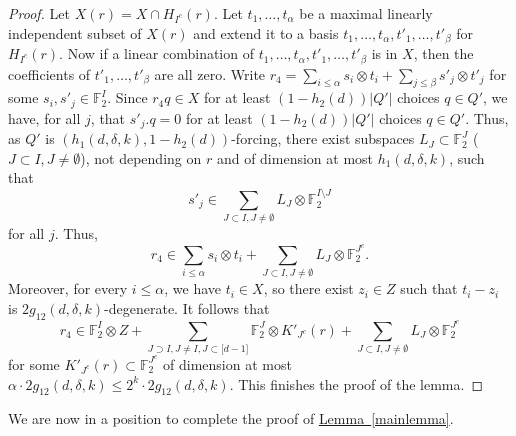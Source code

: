 \documentclass[11pt]{article}
\numberwithin{equation}{section}
\theoremstyle{definition}
\theoremstyle{plain}
\newcommand{\expref}[2]{\hyperref[#2]{#1~\ref{#2}}}
\newcommand\F{\mathbb{F}}
\renewcommand\a{\alpha}
\renewcommand\d{\delta}
\newcommand \s{\subset}
\begin{document}
\begin{proof}
  Let $X(r)=X\cap H_{I^c}(r)$. Let $t_1,\dots,t_{\a}$ be a maximal linearly independent subset of $X(r)$ and extend it to a basis $t_1,\dots,t_{\a},t'_1,\dots,t'_{\beta}$ for $H_{I^c}(r)$. Now if a linear combination of $t_1,\dots,t_{\a},t'_1,\dots,t'_{\beta}$ is in $X$, then the coefficients of $t'_1,\dots,t'_{\beta}$ are all zero. Write $r_4=\sum_{i\leq \a}s_i\otimes t_i+\sum_{j\leq \beta}s'_j\otimes t'_j$ for some $s_i,s'_j\in \F_2^{I}$. Since $r_4q\in X$ for at least $(1-h_2(d))|Q'|$ choices $q\in Q'$, we have, for all $j$, that $s'_j.q=0$ for at least $(1-h_2(d))|Q'|$ choices $q\in Q'$. Thus, as $Q'$ is $(h_1(d,\d,k),1-h_2(d))$-forcing, there exist subspaces $L_J\s \F_2^{J}$ ($J\s I,J\neq \emptyset$), not depending on $r$ and of dimension at most $h_1(d,\d,k)$, such that
  \[
    s'_j\in \sum_{J\s I,J\neq \emptyset} L_J\otimes \F_2^{I\setminus J}
  \]
  for all $j$. Thus,
  \[
    r_4\in \sum_{i\leq \a}s_i\otimes t_i+\sum_{J\s I,J\neq \emptyset}
    L_J\otimes \F_2^{J^c}.
  \]
  Moreover, for every $i\leq \a$, we have
  $t_i\in X$, so there exist $z_i\in Z$ such that $t_i-z_i$ is
  $2g_{12}(d,\d,k)$-degenerate. It follows that
  \[
    r_4\in \F_2^{I}\otimes Z+\sum_{J\supset I,J\neq I,J\subset \lbrack
      d-1\rbrack} \F_2^{J}\otimes K'_{J^c}(r)+\sum_{J\s I,J\neq
      \emptyset} L_J\otimes \F_2^{J^c}
  \]
  for some $K'_{J^c}(r)\s \F_2^{J^c}$ of dimension at most
  $\a\cdot 2g_{12}(d,\d,k)\leq 2^k\cdot 2g_{12}(d,\d,k)$. This
  finishes the proof of the lemma.
\end{proof}

We are now in a position to complete the proof of \expref{Lemma}{mainlemma}.
\end{document}
